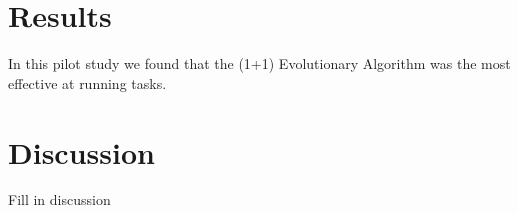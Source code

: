 \documentclass[twoside]{article}
\begin{document}
\begin{multicols}{2}
\section{Results}

In this pilot study we found that the (1+1) Evolutionary Algorithm was the most
effective at running tasks.


\section{Discussion}

Fill in discussion

\end{multicols}
\end{document}
